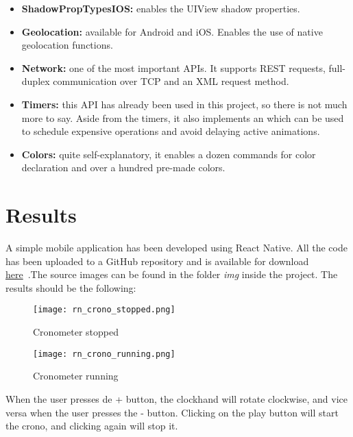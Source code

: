 \begin{itemize}
 \item \textbf{ShadowPropTypesIOS:} enables the UIView shadow properties.
 \item \textbf{Geolocation:} available for Android and iOS. Enables the use of native geolocation functions.
 \item \textbf{Network:} one of the most important APIs. It supports REST requests,  full-duplex communication over TCP and an XML request method.
 \item \textbf{Timers:} this API has already been used in this project, so there is not much more to say. Aside from the timers, it also implements an  which can be used to schedule expensive operations and avoid delaying active animations.
 \item \textbf{Colors:} quite self-explanatory, it enables a dozen commands for color declaration and over a hundred pre-made colors.\cite{ftt2011}
\end{itemize}

\section{Results}

A simple mobile application has been developed using React Native. All the code has been uploaded to a GitHub repository and is available for download \href{https://github.com/IgnacioMV/Cronometer}{here}~\cite{repo}.The source images can be found in the folder \textit{img} inside the project. The results should be the following:

\begin{figure}[H]
\centering
\begin{minipage}{.5\textwidth}
  \centering
  \texttt{[image: rn\_crono\_stopped.png]}
  \caption{Cronometer stopped\label{fig:rncronostoppd}}
  \label{fig:test1}
\end{minipage}%
\begin{minipage}{.5\textwidth}
  \centering
  \texttt{[image: rn\_crono\_running.png]}
  \caption{Cronometer running\label{fig:rncronorunning}}
  \label{fig:test2}
\end{minipage}
\end{figure}

When the user presses de + button, the clockhand will rotate clockwise, and vice versa when the user presses the - button. Clicking on the play button will start the crono, and clicking again will stop it.